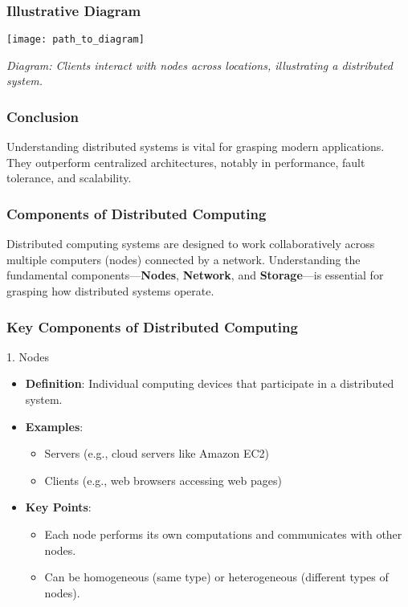 \documentclass[aspectratio=169]{beamer}
\begin{document}
\begin{frame}[fragile]
    \frametitle{Illustrative Diagram}
    \begin{center}
        \texttt{[image: path\_to\_diagram]} %
    \end{center}
    \textit{Diagram: Clients interact with nodes across locations, illustrating a distributed system.}
\end{frame}

\begin{frame}[fragile]
    \frametitle{Conclusion}
    Understanding distributed systems is vital for grasping modern applications. They outperform centralized architectures, notably in performance, fault tolerance, and scalability.
\end{frame}

\begin{frame}[fragile]
    \frametitle{Components of Distributed Computing}
    Distributed computing systems are designed to work collaboratively across multiple computers (nodes) connected by a network. 
    Understanding the fundamental components—\textbf{Nodes}, \textbf{Network}, and \textbf{Storage}—is essential for grasping how distributed systems operate.
\end{frame}

\begin{frame}[fragile]
    \frametitle{Key Components of Distributed Computing}
    \begin{block}{1. Nodes}
        \begin{itemize}
            \item \textbf{Definition}: Individual computing devices that participate in a distributed system.
            \item \textbf{Examples}: 
            \begin{itemize}
                \item Servers (e.g., cloud servers like Amazon EC2)
                \item Clients (e.g., web browsers accessing web pages)
            \end{itemize}
            \item \textbf{Key Points}:
            \begin{itemize}
                \item Each node performs its own computations and communicates with other nodes.
                \item Can be homogeneous (same type) or heterogeneous (different types of nodes).
            \end{itemize}
        \end{itemize}
    \end{block}
\end{frame}
\end{document}
